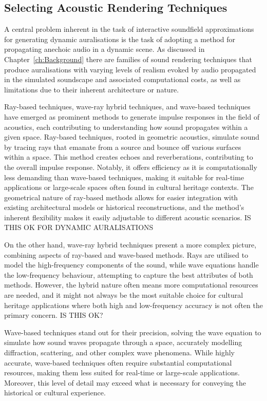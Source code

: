 \subsection{Selecting Acoustic Rendering Techniques}
A central problem inherent in the task of interactive soundfield approximations for generating dynamic auralisations is the task of adopting a method for propagating anechoic audio in a dynamic scene. As discussed in Chapter~\ref{ch:Background} there are families of sound rendering techniques that produce auralisations with varying levels of realism evoked by audio propagated in the simulated soundscape and associated computational costs, as well as limitations due to their inherent architecture or nature.

Ray-based techniques, wave-ray hybrid techniques, and wave-based techniques have emerged as prominent methods to generate impulse responses in the field of acoustics, each contributing to understanding how sound propagates within a given space. Ray-based techniques, rooted in geometric acoustics, simulate sound by tracing rays that emanate from a source and bounce off various surfaces within a space. This method creates echoes and reverberations, contributing to the overall impulse response. Notably, it offers efficiency as it is computationally less demanding than wave-based techniques, making it suitable for real-time applications or large-scale spaces often found in cultural heritage contexts. The geometrical nature of ray-based methods allows for easier integration with existing architectural models or historical reconstructions, and the method's inherent flexibility makes it easily adjustable to different acoustic scenarios. IS THIS OK FOR DYNAMIC AURALISATIONS

On the other hand, wave-ray hybrid techniques present a more complex picture, combining aspects of ray-based and wave-based methods. Rays are utilised to model the high-frequency components of the sound, while wave equations handle the low-frequency behaviour, attempting to capture the best attributes of both methods. However, the hybrid nature often means more computational resources are needed, and it might not always be the most suitable choice for cultural heritage applications where both high and low-frequency accuracy is not often the primary concern. IS THIS OK?

Wave-based techniques stand out for their precision, solving the wave equation to simulate how sound waves propagate through a space, accurately modelling diffraction, scattering, and other complex wave phenomena. While highly accurate, wave-based techniques often require substantial computational resources, making them less suited for real-time or large-scale applications. Moreover, this level of detail may exceed what is necessary for conveying the historical or cultural experience.


